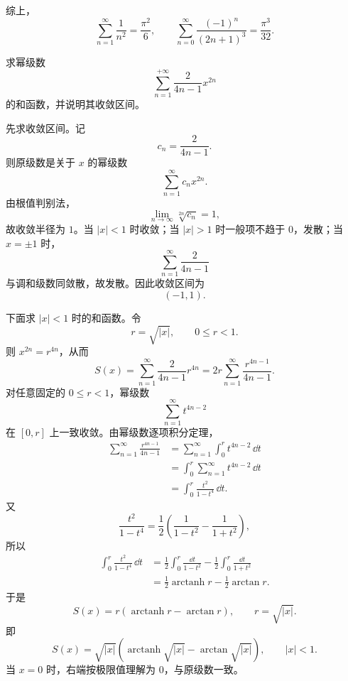 \begin{question}[20分]
\begin{solution}
综上，
\[
  \boxed{\displaystyle \sum_{n=1}^{\infty}\frac1{n^2}=\frac{\pi^2}{6}},
  \qquad
  \boxed{\displaystyle \sum_{n=0}^{\infty}\frac{(-1)^n}{(2n+1)^3}=\frac{\pi^3}{32}}.
\]
\end{solution}
\end{question}

\begin{question}[15分]
求幂级数
\[
  \sum_{n=1}^{+\infty}\frac{2}{4n-1}x^{2n}
\]
的和函数，并说明其收敛区间。
\begin{solution}
先求收敛区间。记
\[
  c_n=\frac{2}{4n-1}.
\]
则原级数是关于 $x$ 的幂级数
\[
  \sum_{n=1}^{\infty}c_n x^{2n}.
\]
由根值判别法，
\[
  \lim_{n\to\infty}\sqrt[2n]{c_n}=1,
\]
故收敛半径为 $1$。当 $|x|<1$ 时收敛；当 $|x|>1$ 时一般项不趋于 $0$，发散；当 $x=\pm1$ 时，
\[
  \sum_{n=1}^{\infty}\frac{2}{4n-1}
\]
与调和级数同敛散，故发散。因此收敛区间为
\[
  (-1,1).
\]

下面求 $|x|<1$ 时的和函数。令
\[
  r=\sqrt{|x|},
  \qquad 0\le r<1.
\]
则 $x^{2n}=r^{4n}$，从而
\[
  S(x)=\sum_{n=1}^{\infty}\frac{2}{4n-1}r^{4n}
  =2r\sum_{n=1}^{\infty}\frac{r^{4n-1}}{4n-1}.
\]
对任意固定的 $0\le r<1$，幂级数
\[
  \sum_{n=1}^{\infty}t^{4n-2}
\]
在 $[0,r]$ 上一致收敛。由幂级数逐项积分定理，
\[
\begin{aligned}
  \sum_{n=1}^{\infty}\frac{r^{4n-1}}{4n-1}
  &=
  \sum_{n=1}^{\infty}\int_0^r t^{4n-2}\,\dd{t}  \\
  &=
  \int_0^r\sum_{n=1}^{\infty}t^{4n-2}\,\dd{t}  \\
  &=
  \int_0^r\frac{t^2}{1-t^4}\,\dd{t} .
\end{aligned}
\]
又
\[
  \frac{t^2}{1-t^4}
  =
  \frac12\left(\frac1{1-t^2}-\frac1{1+t^2}\right),
\]
所以
\[
\begin{aligned}
  \int_0^r\frac{t^2}{1-t^4}\,\dd{t}
  &=
  \frac12\int_0^r\frac{\dd{t}}{1-t^2}
  -\frac12\int_0^r\frac{\dd{t}}{1+t^2}  \\
  &=
  \frac12\operatorname{arctanh}r-\frac12\arctan r.
\end{aligned}
\]
于是
\[
  S(x)
  =
  r\left(\operatorname{arctanh}r-\arctan r\right),
  \qquad r=\sqrt{|x|}.
\]
即
\[
  \boxed{\displaystyle
  S(x)=
  \sqrt{|x|}
  \left(
    \operatorname{arctanh}\sqrt{|x|}
    -\arctan\sqrt{|x|}
  \right),
  \qquad |x|<1 .}
\]
当 $x=0$ 时，右端按极限值理解为 $0$，与原级数一致。
\end{solution}
\end{question}


